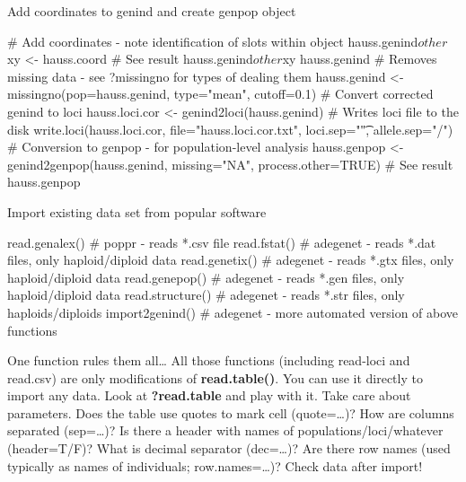 \documentclass[compress, ucs, xelatex, 11pt, xcolor=svgnames,
  hyperref={
    bookmarks=true,
    unicode=true,
    colorlinks=true,
    pdftitle={Molecular data in R},
    plainpages=false,
    pdfauthor={Vojtech Zeisek},
    pdfsubject={Course about phylogeny and evolution in R},
    pdfcreator={XeLaTeX},
    pdfkeywords={R, evolution, phylogeny, molecular data},
    linkcolor=Tomato,
    anchorcolor=SaddleBrown,
    citecolor=Goldenrod,
    filecolor=DarkMagenta,
    menucolor=Sienna,
    urlcolor=DarkTurquoise,
    pdftex},
  url={hyphens, lowtilde} %
  ]{beamer}
\begin{document}
\begin{frame}[fragile]{Add coordinates to genind and create genpop object}
  \begin{spluscode}
    # Add coordinates - note identification of slots within object
    hauss.genind$other$xy <- hauss.coord
    # See result
    hauss.genind$other$xy
    hauss.genind
    # Removes missing data - see ?missingno for types of dealing them
    hauss.genind <- missingno(pop=hauss.genind, type="mean", cutoff=0.1)
    # Convert corrected genind to loci
    hauss.loci.cor <- genind2loci(hauss.genind)
    # Writes loci file to the disk
    write.loci(hauss.loci.cor, file="hauss.loci.cor.txt",
      loci.sep="\t", allele.sep="/")
    # Conversion to genpop - for population-level analysis
    hauss.genpop <- genind2genpop(hauss.genind, missing="NA",
      process.other=TRUE)
    # See result
    hauss.genpop
  \end{spluscode}
\end{frame}

\begin{frame}[fragile]{Import existing data set from popular software}
  \begin{spluscode}
    read.genalex() # poppr - reads *.csv file
    read.fstat() # adegenet - reads *.dat files, only haploid/diploid data
    read.genetix() # adegenet - reads *.gtx files, only haploid/diploid data
    read.genepop() # adegenet - reads *.gen files, only haploid/diploid data
    read.structure() # adegenet - reads *.str files, only haploids/diploids
    import2genind() # adegenet - more automated version of above functions
  \end{spluscode}
\begin{block}{One function rules them all\ldots}
  All those functions (including read-loci and read.csv) are only modifications of \textbf{read.table()}. You can use it directly to import any data. Look at \textbf{?read.table} and play with it. Take care about parameters. Does the table use quotes to mark cell (quote=\ldots)? How are columns separated (sep=\ldots)? Is there a header with names of populations/loci/whatever (header=T/F)? What is decimal separator (dec=\ldots)? Are there row names (used typically as names of individuals; row.names=\ldots)? Check data after import!
\end{block}
\end{frame}
\end{document}
